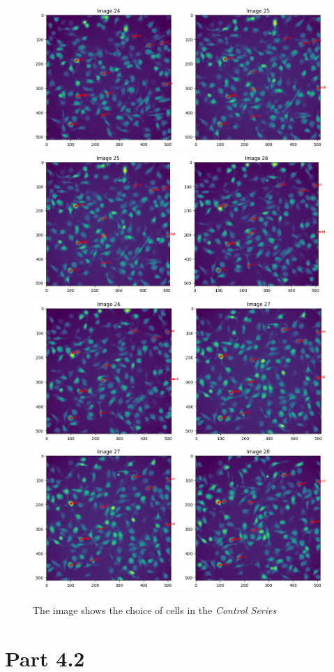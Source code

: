 \documentclass{article}
\begin{document}
\begin{figure}[h!]
\centering
\includegraphics[width=0.75\linewidth]{Report/RImages/Traces_Growth/trace-b25.png}
\includegraphics[width=0.75\linewidth]{Report/RImages/Traces_Growth/trace-b26.png}
\includegraphics[width=0.75\linewidth]
{Report/RImages/Traces_Growth/trace-b27.png}
\includegraphics[width=0.75\linewidth]{Report/RImages/Traces_Growth/trace-b28.png}
\caption{\label{fig:ChoiceofCells-ControlSeries}The image shows the choice of cells in the \emph{Control Series}}
\end{figure}
\section*{Part 4.2}
\end{document}
